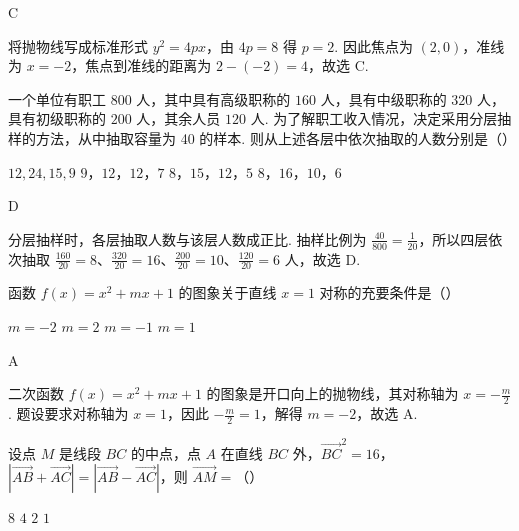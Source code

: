 \begin{answer}
C
\end{answer}

\begin{solution}
将抛物线写成标准形式 \(y^2=4px\)，由 \(4p=8\) 得 \(p=2\). 因此焦点为 \((2,0)\)，准线为 \(x=-2\)，焦点到准线的距离为 \(2-(-2)=4\)，故选 C.
\end{solution}

\begin{problem}
一个单位有职工 \(800\text{ 人}\)，其中具有高级职称的 \(160\text{ 人}\)，具有中级职称的 \(320\text{ 人}\)，具有初级职称的 \(200\text{ 人}\)，其余人员 \(120\text{ 人}\). 为了解职工收入情况，决定采用分层抽样的方法，从中抽取容量为 40 的样本. 则从上述各层中依次抽取的人数分别是（\quad）

\choices
    {\(12, 24, 15, 9\)}
    {\(9\)，\(12\)，\(12\)，\(7\)}
    {\(8\)，\(15\)，\(12\)，\(5\)}
    {\(8\)，\(16\)，\(10\)，\(6\)}
\end{problem}

\begin{answer}
D
\end{answer}

\begin{solution}
分层抽样时，各层抽取人数与该层人数成正比. 抽样比例为 \(\frac{40}{800}=\frac{1}{20}\)，所以四层依次抽取 \(\frac{160}{20}=8\)、\(\frac{320}{20}=16\)、\(\frac{200}{20}=10\)、\(\frac{120}{20}=6\) 人，故选 D.
\end{solution}

\begin{problem}
函数 \( f(x) = x^{2} + mx + 1 \) 的图象关于直线 \( x = 1 \) 对称的充要条件是（\quad）

\choices
    {\(m = -2\)}
    {\(m = 2\)}
    {\(m = -1\)}
    {\(m = 1\)}
\end{problem}

\begin{answer}
A
\end{answer}

\begin{solution}
二次函数 \(f(x)=x^2+mx+1\) 的图象是开口向上的抛物线，其对称轴为 \(x=-\frac{m}{2}\). 题设要求对称轴为 \(x=1\)，因此 \(-\frac{m}{2}=1\)，解得 \(m=-2\)，故选 A.
\end{solution}

\begin{problem}
设点 \(M\) 是线段 \(BC\) 的中点，点 \(A\) 在直线 \(BC\) 外，\( \overrightarrow{BC}^{2}=16 \)，\( \left|\overrightarrow{AB}+\overrightarrow{AC}\right|=\left|\overrightarrow{AB}-\overrightarrow{AC}\right| \)，则 \( \overrightarrow{AM}= \)（\quad）

\choices
    {\(8\)}
    {\(4\)}
    {\(2\)}
    {\(1\)}
\end{problem}

